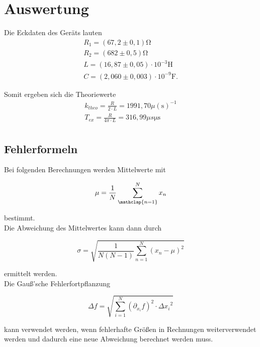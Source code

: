 \section{Auswertung}
\label{sec:Auswertung}

Die Eckdaten des Geräts lauten 
\begin{align*}
  R_1 = (67,2 \pm 0,1) \mathrm{\Omega} \\
  R_2 = (682 \pm 0,5) \mathrm{\Omega} \\
  L = (16,87 \pm 0,05) \cdot 10^{-3}\mathrm{H} \\
  C = (2,060 \pm 0,003) \cdot 10^{-9}\mathrm{F}.   %
\end{align*}


Somit ergeben sich die Theoriewerte 
\begin{align*}
  k_{theo} = \frac{R}{2 \cdot L} = 1991,70 \mu \mathrm{(s)^{-1}} \\
  T_{ex} = \frac{R}{4 \pi \cdot L} = 316,99 \mu s\mathrm{\mu s} \\  %
\end{align*}


\subsection{Fehlerformeln}
\label{subsec:fehler}

Bei folgenden Berechnungen werden Mittelwerte mit
\begin{center}
  \begin{equation}
    \mu = \dfrac{1}{N}\sum\limits_{\mathclap{n=1}}^{N}x_n
  \end{equation}
\end{center}

bestimmt. \\
Die Abweichung des Mittelwertes kann dann durch
\begin{center}
  \begin{equation}
    \sigma=\sqrt{\dfrac{1}{N(N-1)}\sum\limits_{n=1}^{N} (x_n - \mu)^2}
  \end{equation}
\end{center}
ermittelt werden.\\
Die Gauß'sche Fehlerfortpflanzung
\begin{center}
  \begin{equation}
    \Delta f = \sqrt{\sum_{i=1}^{N}\left(\partial_{x_i}f\right)^2\cdot{\Delta x_i}^2}
  \end{equation}
\end{center}
kann verwendet werden, wenn fehlerhafte Größen in Rechnungen weiterverwendet werden und dadurch eine neue Abweichung
berechnet werden muss.





